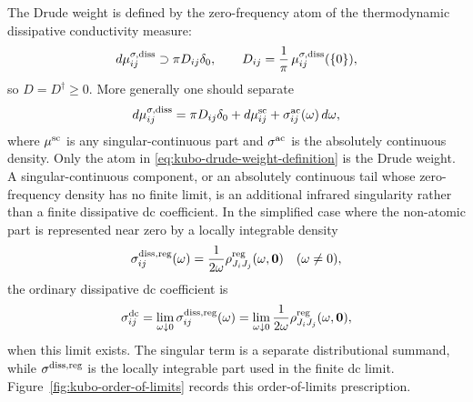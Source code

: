 The Drude weight is defined by the zero-frequency atom of the thermodynamic
dissipative conductivity measure:
\begin{equation}
  d\mu^{\sigma,\rm diss}_{ij}
  \supset
  \pi D_{ij}\delta_0,
  \qquad
  D_{ij}
  =
  \frac1\pi\,\mu^{\sigma,\rm diss}_{ij}(\{0\}),
  \label{eq:kubo-drude-weight-definition}
\end{equation}
so \(D=D^\dagger\ge0\).  More generally one should separate
\begin{equation}
  d\mu^{\sigma,\rm diss}_{ij}
  =
  \pi D_{ij}\delta_0
  +d\mu^{\rm sc}_{ij}
  +\sigma^{\rm ac}_{ij}(\omega)\,d\omega ,
  \label{eq:kubo-drude-regular-decomposition}
\end{equation}
where \(\mu^{\rm sc}\) is any singular-continuous part and
\(\sigma^{\rm ac}\) is the absolutely continuous density.  Only the atom in
\eqref{eq:kubo-drude-weight-definition} is the Drude weight.  A
singular-continuous component, or an absolutely continuous tail whose
zero-frequency density has no finite limit, is an additional infrared
singularity rather than a finite dissipative dc coefficient.  In the
simplified case where the non-atomic part is represented near zero by a
locally integrable density
\[
  \sigma^{{\rm diss},\rm reg}_{ij}(\omega)
  =
  \frac{1}{2\omega}\rho^{\rm reg}_{J_iJ_j}(\omega,\mathbf0)
  \quad(\omega\ne0),
\]
the ordinary dissipative dc coefficient is
\begin{equation}
  \sigma^{\rm dc}_{ij}
  =
  \lim_{\omega\downarrow0}\sigma^{{\rm diss},\rm reg}_{ij}(\omega)
  =
  \lim_{\omega\downarrow0}
  \frac{1}{2\omega}\rho^{\rm reg}_{J_iJ_j}(\omega,\mathbf0),
  \label{eq:kubo-regular-dc-from-regular-spectral-slope}
\end{equation}
when this limit exists.  The singular term is a separate distributional
summand, while \(\sigma^{{\rm diss},\rm reg}\) is the locally integrable part
used in the finite dc limit.  Figure~\ref{fig:kubo-order-of-limits} records
this order-of-limits prescription.

